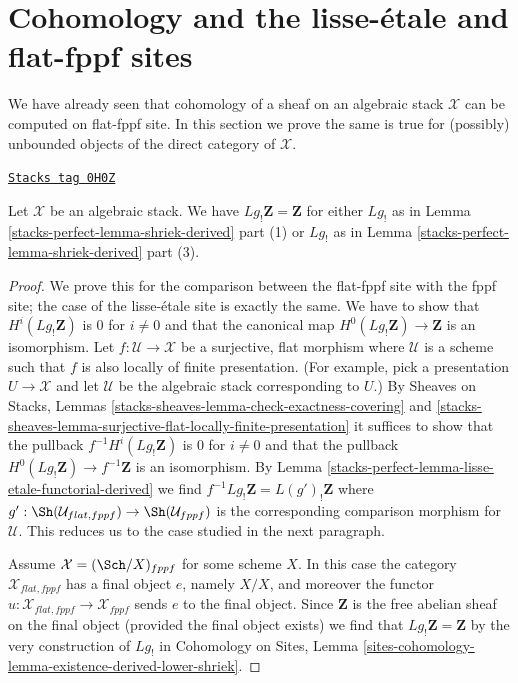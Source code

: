 \section{Cohomology and the lisse-\'etale and flat-fppf sites}
\label{stacks-perfect-section-compare-unbounded-lisse-etale}
We have already seen that cohomology of a sheaf on an algebraic
stack $\mathcal{X}$ can be computed on flat-fppf site. In this
section we prove the same is true for (possibly) unbounded
objects of the direct category of $\mathcal{X}$.

\begin{lemma}
\label{stacks-perfect-lemma-higher-shriek-Z}
\href{https://stacks.math.columbia.edu/tag/0H0Z}{\texttt{Stacks tag 0H0Z}}

Let $\mathcal{X}$ be an algebraic stack. We have
$Lg_!\mathbf{Z} = \mathbf{Z}$ for either $Lg_!$ as in
Lemma \ref{stacks-perfect-lemma-shriek-derived} part (1) or $Lg_!$ as in
Lemma \ref{stacks-perfect-lemma-shriek-derived} part (3).
\end{lemma}

\begin{proof}
We prove this for the comparison between the flat-fppf site with the
fppf site; the case of the lisse-\'etale site is exactly the same.
We have to show that $H^i(Lg_!\mathbf{Z})$ is $0$ for $i \not = 0$
and that the canonical map $H^0(Lg_!\mathbf{Z}) \to \mathbf{Z}$
is an isomorphism. Let $f : \mathcal{U} \to \mathcal{X}$ be a
surjective, flat morphism where $\mathcal{U}$ is a scheme
such that $f$ is also locally of finite presentation.
(For example, pick a presentation $U \to \mathcal{X}$ and
let $\mathcal{U}$ be the algebraic stack corresponding to $U$.)
By Sheaves on Stacks, Lemmas
\ref{stacks-sheaves-lemma-check-exactness-covering} and
\ref{stacks-sheaves-lemma-surjective-flat-locally-finite-presentation}
it suffices to show that the pullback $f^{-1}H^i(Lg_!\mathbf{Z})$
is $0$ for $i \not = 0$ and that the pullback
$H^0(Lg_!\mathbf{Z}) \to f^{-1}\mathbf{Z}$ is an isomorphism.
By Lemma \ref{stacks-perfect-lemma-lisse-etale-functorial-derived} we find
$f^{-1}Lg_!\mathbf{Z} = L(g')_!\mathbf{Z}$ where
$g' : \Sh(\mathcal{U}_{flat, fppf}) \to \Sh(\mathcal{U}_{fppf})$
is the corresponding comparison morphism for $\mathcal{U}$.
This reduces us to the case studied in the next paragraph.

\medskip\noindent
Assume $\mathcal{X} = (\Sch/X)_{fppf}$ for some scheme $X$.
In this case the category $\mathcal{X}_{flat, fppf}$ has
a final object $e$, namely $X/X$, and moreover the functor
$u : \mathcal{X}_{flat, fppf} \to \mathcal{X}_{fppf}$
sends $e$ to the final object. Since $\mathbf{Z}$ is the
free abelian sheaf on the final object (provided the final
object exists) we find that $Lg_!\mathbf{Z} = \mathbf{Z}$ by
the very construction of $Lg_!$ in Cohomology on Sites,
Lemma \ref{sites-cohomology-lemma-existence-derived-lower-shriek}.
\end{proof}

